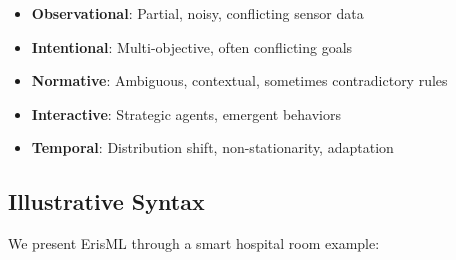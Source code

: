 \documentclass[conference]{IEEEtran}
\begin{document}
\begin{itemize}
\item \textbf{Observational}: Partial, noisy, conflicting sensor data
\item \textbf{Intentional}: Multi-objective, often conflicting goals
\item \textbf{Normative}: Ambiguous, contextual, sometimes contradictory rules
\item \textbf{Interactive}: Strategic agents, emergent behaviors
\item \textbf{Temporal}: Distribution shift, non-stationarity, adaptation
\end{itemize}

\subsection{Illustrative Syntax}

We present ErisML through a smart hospital room example:
\end{document}
